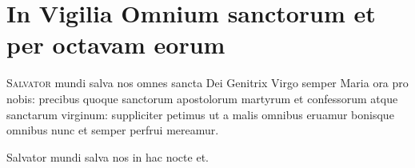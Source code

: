 \chapter[Omnium sanctorum]{In Vigilia Omnium sanctorum et per octavam eorum}
\label{form:omnium}


\lettrine{S}{alvator} mundi salva nos omnes
sancta Dei Genitrix Virgo semper Maria ora pro nobis:
precibus quoque sanctorum apostolorum martyrum et confessorum
atque sanctarum virginum:
suppliciter petimus
ut a malis omnibus
eruamur
bonisque omnibus
nunc et semper
perfrui mereamur.


Salvator mundi salva nos in hac nocte et.

\headingCantus

